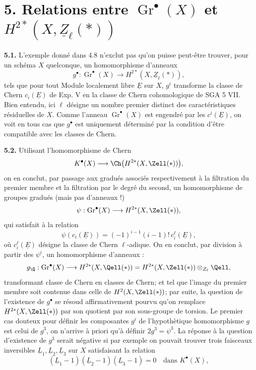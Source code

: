 
\section*{5. Relations entre \(\operatorname{Gr}^\bullet(X)\) et \(H^{2*}(X,\underline{Z}_\ell(*))\)}

\textbf{5.1.} L'exemple donné dans 4.8 n'exclut pas qu'on puisse peut-être trouver, pour un schéma $X$ quelconque, un homomorphisme d'anneaux
\[
 g^\bullet:\operatorname{Gr}^\bullet(X)\longrightarrow H^{2*}(X,\underline{Z}_\ell(*)),
\]
tels que pour tout Module localement libre $\underline{E}$ sur $X$, $g^i$ transforme la classe de Chern $c_i(\underline{E})$ de Exp. V en la classe de Chern cohomologique de SGA 5 VII. Bien entendu, ici $\ell$ désigne un nombre premier distinct des caractéristiques résiduelles de $X$. Comme l'anneau $\operatorname{Gr}^\bullet(X)$ est engendré par les $c^i(\underline{E})$, on voit en tous cas que $g^\bullet$ est uniquement déterminé par la condition d'être compatible avec les classes de Chern.

\textbf{5.2.} Utilisant l'homomorphisme de Chern
\[
 K^\bullet(X)\longrightarrow\Ch\bigl(H^{2*}(X,\Zell(*))\bigr),
\]
on en conclut, par passage aux gradués associés respectivement à la filtration du premier membre et la filtration par le degré du second, un homomorphisme de groupes gradués (mais pas d'anneaux !)
\[
 \psi:\operatorname{Gr}^\bullet(X)\longrightarrow H^{2*}(X,\Zell(*)),
\]
qui satisfait à la relation
\[
 \psi(c_i(\underline{E}))=(-1)^{i-1}(i-1)!\,c_i^\ell(\underline{E}),
\]
où $c_i^\ell(\underline{E})$ désigne la classe de Chern $\ell$-adique. On en conclut, par division à partir des $\psi^i$, un homomorphisme d'anneaux :
\[
 g_\Q:\operatorname{Gr}^\bullet(X)\longrightarrow
 H^{2*}(X,\Qell(*))=
 H^{2*}(X,\Zell(*))\otimes_{Z_\ell}\Qell,
\]
transformant classe de Chern en classes de Chern; et tel que l'image du premier membre soit contenue dans celle de $H^2(X,\Zell(*))$; par suite, la question de l'existence de $g^\bullet$ se résoud affirmativement pourvu qu'on remplace $H^{2*}(X,\Zell(*))$ par son quotient par son sous-groupe de torsion. Le premier cas douteux pour définir les composantes $g^i$ de l'hypothètique homomorphisme $g$ est celui de $g^3$, on n'arrive à priori qu'à définir $2g^3=\psi^3$. La réponse à la question d'existence de $g^3$ serait négative si par exemple on pouvait trouver trois faisceaux inversibles $\underline{L}_1,\underline{L}_2,\underline{L}_3$ sur $X$ satisfaisant la relation
\[
 (\underline{L}_1-1)(\underline{L}_2-1)(\underline{L}_3-1)=0\quad\text{dans }K^\bullet(X),
\]
